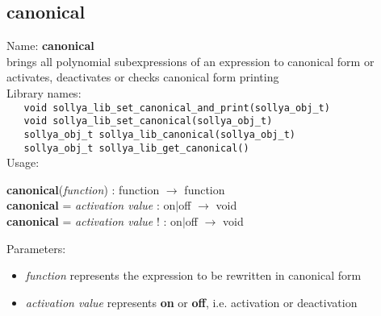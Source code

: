 \subsection{canonical}
\label{labcanonical}
\noindent Name: \textbf{canonical}\\
\phantom{aaa}brings all polynomial subexpressions of an expression to canonical form or activates, deactivates or checks canonical form printing\\[0.2cm]
\noindent Library names:\\
\verb|   void sollya_lib_set_canonical_and_print(sollya_obj_t)|\\
\verb|   void sollya_lib_set_canonical(sollya_obj_t)|\\
\verb|   sollya_obj_t sollya_lib_canonical(sollya_obj_t)|\\
\verb|   sollya_obj_t sollya_lib_get_canonical()|\\[0.2cm]
\noindent Usage: 
\begin{center}
\textbf{canonical}(\emph{function}) : \textsf{function} $\rightarrow$ \textsf{function}\\
\textbf{canonical} = \emph{activation value} : \textsf{on$|$off} $\rightarrow$ \textsf{void}\\
\textbf{canonical} = \emph{activation value} ! : \textsf{on$|$off} $\rightarrow$ \textsf{void}\\
\end{center}
Parameters: 
\begin{itemize}
\item \emph{function} represents the expression to be rewritten in canonical form
\item \emph{activation value} represents \textbf{on} or \textbf{off}, i.e. activation or deactivation
\end{itemize}
